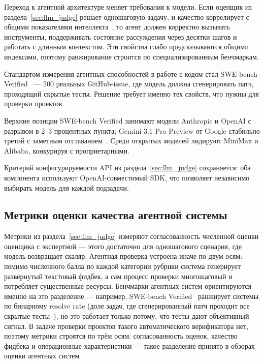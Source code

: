 Переход к агентной архитектуре меняет требования к модели. Если оценщик
из раздела~\ref{sec:llm_judge} решает одношаговую задачу, и качество
коррелирует с общими показателями интеллекта~\cite{artificialanalysis2026},
то агент должен корректно вызывать инструменты, поддерживать состояние
рассуждения через десятки шагов и работать с длинным контекстом. Эти
свойства слабо предсказываются общими индексами, поэтому ранжирование
строится по специализированным бенчмаркам.

Стандартом измерения агентных способностей в работе с кодом стал
SWE-bench Verified~\cite{swebench2024} --- 500 реальных GitHub-issue, где
модель должна сгенерировать патч, проходящий скрытые тесты. Решение
требует именно тех свойств, что нужны для проверки проектов.

Верхние позиции SWE-bench Verified занимают модели Anthropic и OpenAI с
разрывом в 2--3 процентных пункта; Gemini 3.1 Pro Preview от Google
стабильно третий с заметным отставанием~\cite{swebench_leaderboard2026}.
Среди открытых моделей лидируют MiniMax и Alibaba, конкурируя с
проприетарными.

Критерий конфигурируемости API из раздела~\ref{sec:llm_judge} сохраняется:
оба компонента используют OpenAI-совместимый SDK, что позволяет
независимо выбирать модель для каждой подзадачи.

\subsection{Метрики оценки качества агентной системы}\label{sec:agent_metrics}

Метрики из раздела~\ref{sec:llm_judge} измеряют согласованность численной
оценки оценщика с экспертной --- этого достаточно для одношагового
сценария, где модель возвращает скаляр. Агентная проверка устроена иначе
по двум осям: помимо численного балла по каждой категории рубрики
система генерирует развёрнутый текстовый фидбек, а сам процесс проверки
многошаговый и потребляет существенные ресурсы. Бенчмарки агентных
систем ориентируются именно на это разделение --- например, SWE-bench
Verified~\cite{swebench2024} ранжирует системы по бинарному
resolve rate (доле задач, где сгенерированный патч проходит все
скрытые тесты~\cite{swebench_eval2025}), но это работает только потому,
что тесты дают объективный сигнал. В задаче проверки проектов такого
автоматического верификатора нет, поэтому метрики строятся по трём
осям: согласованность оценок, качество фидбека и операционные
характеристики --- такое разделение принято в обзорах оценки агентных
систем~\cite{agenteval2025}.
 
